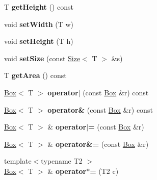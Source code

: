\begin{DoxyCompactItemize}
\item 
\hypertarget{class_box_a4658e043d83b5360bc186a73c1859313}{
T {\bfseries getHeight} () const }
\label{class_box_a4658e043d83b5360bc186a73c1859313}

\item 
\hypertarget{class_box_a7cfb90348077f6476e5f9aa7ff8d851d}{
void {\bfseries setWidth} (T w)}
\label{class_box_a7cfb90348077f6476e5f9aa7ff8d851d}

\item 
\hypertarget{class_box_a88efe31d53ff3895a3036e7f183152d7}{
void {\bfseries setHeight} (T h)}
\label{class_box_a88efe31d53ff3895a3036e7f183152d7}

\item 
\hypertarget{class_box_acd6d5e40c68328ff7a000574a306483b}{
void {\bfseries setSize} (const \hyperlink{class_size}{Size}$<$ T $>$ \&s)}
\label{class_box_acd6d5e40c68328ff7a000574a306483b}

\item 
\hypertarget{class_box_aa929e8c0b27bef9952ee0609eacf9181}{
T {\bfseries getArea} () const }
\label{class_box_aa929e8c0b27bef9952ee0609eacf9181}

\item 
\hypertarget{class_box_ad98b489652ab9b1e98171bc07c3526b0}{
\hyperlink{class_box}{Box}$<$ T $>$ {\bfseries operator$|$} (const \hyperlink{class_box}{Box} \&r) const }
\label{class_box_ad98b489652ab9b1e98171bc07c3526b0}

\item 
\hypertarget{class_box_a4e303bf9c573dba8cfe7b6f699741040}{
\hyperlink{class_box}{Box}$<$ T $>$ {\bfseries operator\&} (const \hyperlink{class_box}{Box} \&r) const }
\label{class_box_a4e303bf9c573dba8cfe7b6f699741040}

\item 
\hypertarget{class_box_a39321d3603921427af4abc73cf6409df}{
\hyperlink{class_box}{Box}$<$ T $>$ \& {\bfseries operator$|$=} (const \hyperlink{class_box}{Box} \&r)}
\label{class_box_a39321d3603921427af4abc73cf6409df}

\item 
\hypertarget{class_box_acbbf74126e4790b025fdfb4942d5b7e7}{
\hyperlink{class_box}{Box}$<$ T $>$ \& {\bfseries operator\&=} (const \hyperlink{class_box}{Box} \&r)}
\label{class_box_acbbf74126e4790b025fdfb4942d5b7e7}

\item 
\hypertarget{class_box_aa18658b5477c00c191f9b3c855924b2f}{
{\footnotesize template$<$typename T2 $>$ }\\\hyperlink{class_box}{Box}$<$ T $>$ \& {\bfseries operator$\ast$=} (T2 c)}
\label{class_box_aa18658b5477c00c191f9b3c855924b2f}


\end{DoxyCompactItemize}
